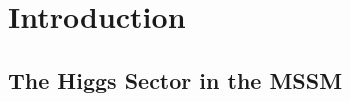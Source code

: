 %
%
%


\restoregeometry
\clearpage
\newpage

\section{Introduction } \label{sec:intro}

\subsection{The Higgs Sector in the MSSM}

